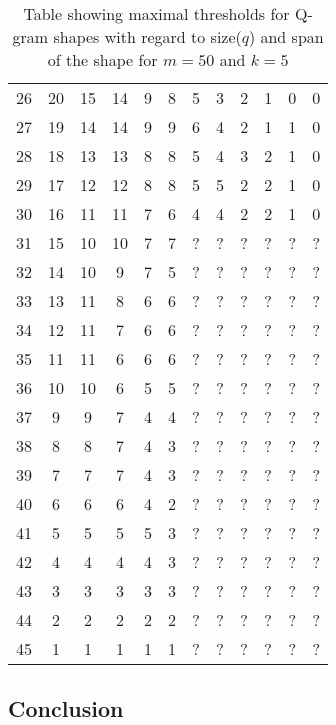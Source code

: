 \documentclass[paper=a4, fontsize=11pt]{scrartcl} %
\numberwithin{equation}{section} %
\numberwithin{figure}{section} %
\numberwithin{table}{section} %
\begin{document}
\begin{table}[H]
\begin{tabular} {|c|c|c|c|c|c|c|c|c|c|c|c|}
	26 & 20 & 15 & 14 & 9 & 8 & 5 & 3 & 2 & 1 & 0 & 0 \\
	27 & 19 & 14 & 14 & 9 & 9 & 6 & 4 & 2 & 1 & 1 & 0 \\
	28 & 18 & 13 & 13 & 8 & 8 & 5 & 4 & 3 & 2 & 1 & 0 \\
	29 & 17 & 12 & 12 & 8 & 8 & 5 & 5 & 2 & 2 & 1 & 0 \\
	30 & 16 & 11 & 11 & 7 & 6 & 4 & 4 & 2 & 2 & 1 & 0 \\
	31 & 15 & 10 & 10 & 7 & 7 & ? & ? & ? & ? & ? & ? \\
	32 & 14 & 10 & 9 & 7 & 5 & ? & ? & ? & ? & ? & ? \\
	33 & 13 & 11 & 8 & 6 & 6 & ? & ? & ? & ? & ? & ? \\
	34 & 12 & 11 & 7 & 6 & 6 & ? & ? & ? & ? & ? & ? \\
	35 & 11 & 11 & 6 & 6 & 6 & ? & ? & ? & ? & ? & ? \\
	36 & 10 & 10 & 6 & 5 & 5 & ? & ? & ? & ? & ? & ? \\
	37 & 9 & 9 & 7 & 4 & 4 & ? & ? & ? & ? & ? & ? \\
	38 & 8 & 8 & 7 & 4 & 3 & ? & ? & ? & ? & ? & ? \\
	39 & 7 & 7 & 7 & 4 & 3 & ? & ? & ? & ? & ? & ? \\
	40 & 6 & 6 & 6 & 4 & 2 & ? & ? & ? & ? & ? & ? \\
	41 & 5 & 5 & 5 & 5 & 3 & ? & ? & ? & ? & ? & ? \\
	42 & 4 & 4 & 4 & 4 & 3 & ? & ? & ? & ? & ? & ? \\
	43 & 3 & 3 & 3 & 3 & 3 & ? & ? & ? & ? & ? & ? \\
	44 & 2 & 2 & 2 & 2 & 2 & ? & ? & ? & ? & ? & ? \\
	45 & 1 & 1 & 1 & 1 & 1 & ? & ? & ? & ? & ? & ? \\ \hline
\end{tabular}
\caption{Table showing maximal thresholds for Q-gram shapes with regard to
size($q$) and span of the shape for $m=50$ and $k=5$}
\label{tab:res2}
\end{table}



\subsection{Conclusion}
\end{document}
